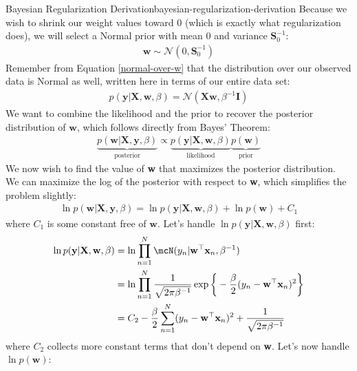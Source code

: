 \begin{derivation}{Bayesian Regularization Derivation}{bayesian-regularization-derivation}
    Because we wish to shrink our weight values toward 0 (which is exactly what regularization does), we will select a Normal prior with mean 0 and variance $\mathbf{S}_{0}^{-1}$:
    \begin{align*}
        \textbf{w} \sim \mathcal{N}(0, \mathbf{S}_{0}^{-1})
    \end{align*}
    Remember from Equation \ref{normal-over-w} that the distribution over our observed data is Normal as well, written here in terms of our entire data set:
    \begin{align*}
        p(\textbf{y} | \textbf{X}, \textbf{w}, \beta) = \mathcal{N}(\textbf{X}\textbf{w}, \beta^{-1}\textbf{I})
    \end{align*}
    We want to combine the likelihood and the prior to recover the posterior distribution of $\textbf{w}$, which follows directly from Bayes' Theorem:
    \begin{align*}
        \underbrace{p(\textbf{w}|\textbf{X},\textbf{y}, \beta)}_{\text{posterior}} \propto \underbrace{p(\textbf{y}| \textbf{X}, \textbf{w}, \beta)}_{\text{likelihood}}\underbrace{p(\textbf{w})}_{\text{prior}}
    \end{align*}
    We now wish to find the value of \textbf{w} that maximizes the posterior distribution. We can maximize the log of the posterior with respect to \textbf{w}, which simplifies the problem slightly:
    \begin{align*}
        \ln{p(\textbf{w}|\textbf{X},\textbf{y}, \beta)} = \ln{p(\textbf{y}| \textbf{X}, \textbf{w}, \beta)} + \ln{p(\textbf{w})} + C_1
    \end{align*}
    where $C_1$ is some constant free of $\mathbf{w}$. 
    Let's handle $\ln{p(\textbf{y}| \textbf{X}, \textbf{w}, \beta)}$ first:
    \begin{align*}
        \ln{p(\textbf{y}| \textbf{X}, \textbf{w}, \beta)} &= \ln{\prod_{n=1}^{N} \mcN(y_{n} | \textbf{w}^\top \textbf{x}_{n}, \beta^{-1})} \\
        &= \ln{\prod_{n=1}^{N} \frac{1}{\sqrt{2\pi\beta^{-1}}} \exp{\bigg\{-\frac{\beta}{2}(y_{n} - \textbf{w}^\top \textbf{x}_{n})^2\bigg\}}} \\
        &= C_2 -\frac{\beta}{2}\sum_{n=1}^{N} (y_{n} - \textbf{w}^\top \textbf{x}_{n})^2 + \frac{1}{\sqrt{2\pi\beta^{-1}}}
    \end{align*}
    where $C_2$ collects more constant terms that don't depend on \textbf{w}. Let's now handle $\ln{p(\textbf{w})}$:

\end{derivation}
